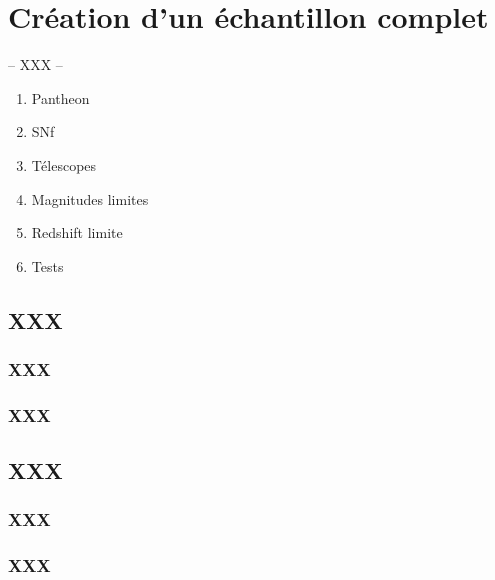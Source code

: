 \documentclass[../main/main.tex]{subfiles}
\begin{document}
\chapter{Cr\'eation d'un \'echantillon complet}\label{ch:sample}

-- XXX --

\minitoc
\begin{enumerate}
    \item Pantheon
    \item SNf
    \item Télescopes
    \item Magnitudes limites
    \item Redshift limite
    \item Tests
\end{enumerate}
\newpage

\section{XXX}

\subsection{XXX}

\subsection{XXX}


\section{XXX}

\subsection{XXX}

\subsection{XXX}
\end{document}
